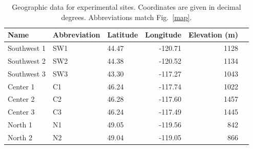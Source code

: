 \documentclass{article}
\newcommand{\beginsupplement}{%
        \setcounter{table}{0}
        \renewcommand{\thetable}{S\arabic{table}}%
        \setcounter{figure}{0}
        \renewcommand{\thefigure}{S\arabic{figure}}%
     }
\begin{document}
\beginsupplement

\clearpage 
{}
    \setcounter{page}{1}

\begin{table}[p]
\centering
\captionsetup{singlelinecheck = false, justification=justified}
\caption[Geographic data for experimental sites]{Geographic data for experimental sites. Coordinates are given in decimal degrees. Abbreviations match Fig.\ \ref{map}.}
\begin{tabular}{lllrrr}
\toprule
Name        & Abbreviation & Latitude & Longitude & Elevation (m) \\
\midrule
Southwest 1 & SW1         & 44.47   & -120.71  & 1128          \\ %
Southwest 2 & SW2         & 44.38   & -120.52  & 1134          \\ %
Southwest 3 & SW3         & 43.30   & -117.27  & 1043          \\ %
Center 1    & C1          & 46.24   & -117.74  & 1022          \\ %
Center 2    & C2          & 46.28   & -117.60  & 1457          \\ %
Center 3    & C3          & 46.24   & -117.49  & 1445          \\ %
North 1     & N1          & 49.05    & -119.56   & 842         \\ %
North 2     & N2          & 49.04    & -119.05   & 866         \\ %
\bottomrule
\end{tabular}
\label{siteinfo}
\end{table}
\clearpage
\end{document}
